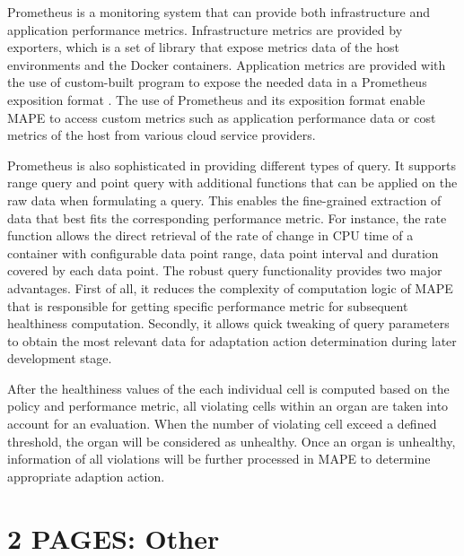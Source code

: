 \documentclass{seal_thesis}
\begin{document}
Prometheus  is a monitoring system that can provide both infrastructure and application performance metrics.
Infrastructure metrics are provided by exporters, which is a set of library that expose metrics data of the host environments and the Docker containers.
Application metrics are provided with the use of custom-built program to expose the needed data in a Prometheus exposition format .
The use of Prometheus and its exposition format enable MAPE to access custom metrics such as application performance data or cost metrics of the host from various cloud service providers.


Prometheus is also sophisticated in providing different types of query.
It supports range query and point query with additional functions that can be applied on the raw data when formulating a query.
This enables the fine-grained extraction of data that best fits the corresponding performance metric.
For instance, the rate function allows the direct retrieval of the rate of change in CPU time of a container with configurable data point range, data point interval and duration covered by each data point.
The robust query functionality provides two major advantages.
First of all, it reduces the complexity of computation logic of MAPE that is responsible for getting specific performance metric for subsequent healthiness computation.
Secondly, it allows quick tweaking of query parameters to obtain the most relevant data for adaptation action determination during later development stage. 

After the healthiness values of the each individual cell is computed based on the policy and performance metric, all violating cells within an organ are taken into account for an evaluation.
When the number of violating cell exceed a defined threshold, the organ will be considered as unhealthy.
Once an organ is unhealthy, information of all violations will be further processed in MAPE to determine appropriate adaption action.




\section{2 PAGES: Other}
\end{document}
